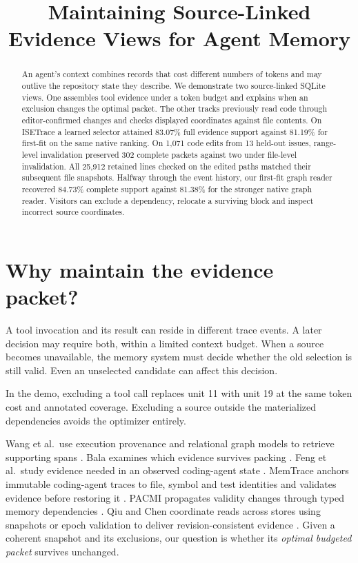 \documentclass[conference]{IEEEtran}
\title{Maintaining Source-Linked Evidence Views for Agent Memory}
\author{}
\begin{document}
\maketitle
\begin{abstract}
An agent's context combines records that cost different numbers of tokens and may outlive the repository state they describe. We demonstrate two source-linked SQLite views. One assembles tool evidence under a token budget and explains when an exclusion changes the optimal packet. The other tracks previously read code through editor-confirmed changes and checks displayed coordinates against file contents. On ISETrace a learned selector attained 83.07\% full evidence support against 81.19\% for first-fit on the same native ranking. On 1,071 code edits from 13 held-out issues, range-level invalidation preserved 302 complete packets against two under file-level invalidation. All 25,912 retained lines checked on the edited paths matched their subsequent file snapshots. Halfway through the event history, our first-fit graph reader recovered 84.73\% complete support against 81.38\% for the stronger native graph reader. Visitors can exclude a dependency, relocate a surviving block and inspect incorrect source coordinates.

\end{abstract}

\section{Why maintain the evidence packet?}

A tool invocation and its result can reside in different trace events. A later decision may require both, within a limited context budget. When a source becomes unavailable, the memory system must decide whether the old selection is still valid. Even an unselected candidate can affect this decision.

In the demo, excluding a tool call replaces unit 11 with unit 19 at the same token cost and annotated coverage. Excluding a source outside the materialized dependencies avoids the optimizer entirely.

Wang et al.\ use execution provenance and relational graph models to retrieve supporting spans \cite{wang}. Bala examines which evidence survives packing \cite{bala}. Feng et al.\ study evidence needed in an observed coding-agent state \cite{feng}. MemTrace anchors immutable coding-agent traces to file, symbol and test identities and validates evidence before restoring it \cite{memtrace}. PACMI propagates validity changes through typed memory dependencies \cite{pacmi}. Qiu and Chen coordinate reads across stores using snapshots or epoch validation to deliver revision-consistent evidence \cite{readboundaries}. Given a coherent snapshot and its exclusions, our question is whether its \emph{optimal budgeted packet} survives unchanged.
\end{document}
